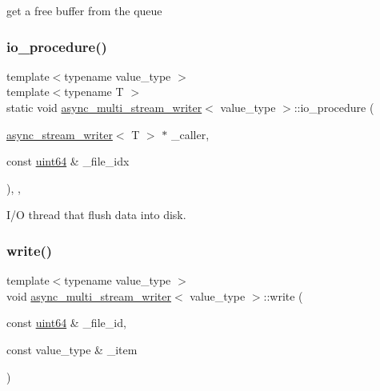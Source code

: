 get a free buffer from the queue 

\mbox{\label{classasync__multi__stream__writer_ae0df727c7d673954c263e5b589a8f0c7}} 
\subsubsection{\texorpdfstring{io\+\_\+procedure()}{io\_procedure()}}
{\footnotesize\ttfamily template$<$typename value\+\_\+type $>$ \\
template$<$typename T $>$ \\
static void \hyperlink{classasync__multi__stream__writer}{async\+\_\+multi\+\_\+stream\+\_\+writer}$<$ value\+\_\+type $>$\+::io\+\_\+procedure (\begin{DoxyParamCaption}\item[{\hyperlink{classasync__stream__writer}{async\+\_\+stream\+\_\+writer}$<$ T $>$ $\ast$}]{\+\_\+caller,  }\item[{const \hyperlink{types_8h_a60e8696a4678cd348e991a1f172e53f7}{uint64} \&}]{\+\_\+file\+\_\+idx }\end{DoxyParamCaption})\hspace{0.3cm}{\ttfamily [inline]}, {\ttfamily [static]}, {\ttfamily [private]}}



I/O thread that flush data into disk. 

\mbox{\label{classasync__multi__stream__writer_a0290b2d5fdf0368559eee905c09863e7}} 
\subsubsection{\texorpdfstring{write()}{write()}\hspace{0.1cm}{\footnotesize\ttfamily [1/2]}}
{\footnotesize\ttfamily template$<$typename value\+\_\+type $>$ \\
void \hyperlink{classasync__multi__stream__writer}{async\+\_\+multi\+\_\+stream\+\_\+writer}$<$ value\+\_\+type $>$\+::write (\begin{DoxyParamCaption}\item[{const \hyperlink{types_8h_a60e8696a4678cd348e991a1f172e53f7}{uint64} \&}]{\+\_\+file\+\_\+id,  }\item[{const value\+\_\+type \&}]{\+\_\+item }\end{DoxyParamCaption})\hspace{0.3cm}{\ttfamily [inline]}}



